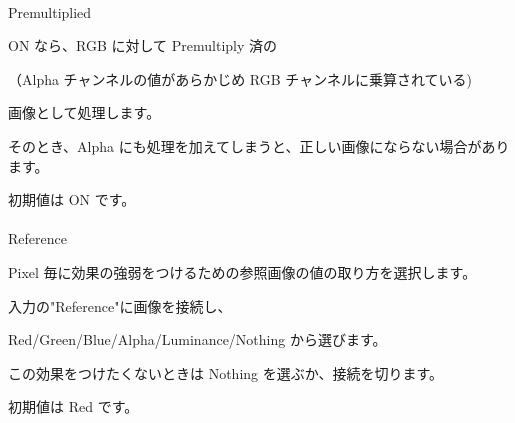 \documentclass[a4paper,12pt]{article}
\begin{document}
\newpage

\thispagestyle{empty}

\ \vspace{-0.2em}
\par
\noindent Premultiplied\par
ON なら、RGB に対して Premultiply 済の\par
（Alpha チャンネルの値があらかじめ RGB チャンネルに乗算されている)\par
画像として処理します。\par
そのとき、Alpha にも処理を加えてしまうと、正しい画像にならない場合があります。\par
初期値は ON です。\\
\\
Reference\par
Pixel 毎に効果の強弱をつけるための参照画像の値の取り方を選択します。\par
入力の"Reference"に画像を接続し、\par
Red/Green/Blue/Alpha/Luminance/Nothing から選びます。\par
この効果をつけたくないときは Nothing を選ぶか、接続を切ります。\par
初期値は Red です。
\end{document}
